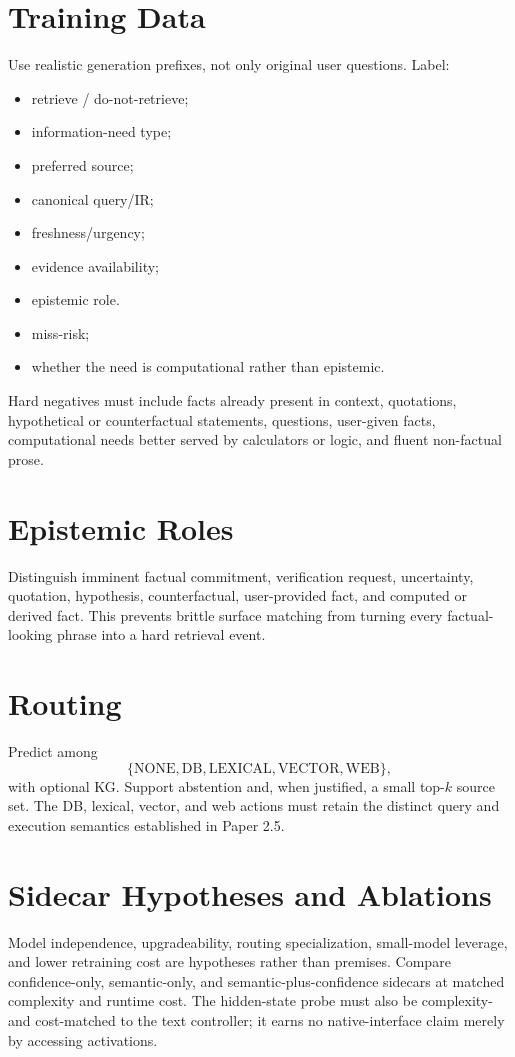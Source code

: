 \documentclass[11pt]{article}
\begin{document}
\section{Training Data}
Use realistic generation prefixes, not only original user questions. Label:
\begin{itemize}
\item retrieve / do-not-retrieve;
\item information-need type;
\item preferred source;
\item canonical query/IR;
\item freshness/urgency;
\item evidence availability;
\item epistemic role.
\item miss-risk;
\item whether the need is computational rather than epistemic.
\end{itemize}

Hard negatives must include facts already present in context, quotations,
hypothetical or counterfactual statements, questions, user-given facts,
computational needs better served by calculators or logic, and fluent
non-factual prose.

\section{Epistemic Roles}
Distinguish imminent factual commitment, verification request, uncertainty,
quotation, hypothesis, counterfactual, user-provided fact, and computed or
derived fact. This prevents brittle surface matching from turning every
factual-looking phrase into a hard retrieval event.

\section{Routing}
Predict among
\[
\{\mathrm{NONE},\mathrm{DB},\mathrm{LEXICAL},\mathrm{VECTOR},\mathrm{WEB}\},
\]
with optional KG. Support abstention and, when justified, a small top-$k$ source
set. The DB, lexical, vector, and web actions must retain the distinct query and
execution semantics established in Paper 2.5.

\section{Sidecar Hypotheses and Ablations}
Model independence, upgradeability, routing specialization, small-model
leverage, and lower retraining cost are hypotheses rather than premises. Compare
confidence-only, semantic-only, and semantic-plus-confidence sidecars at matched
complexity and runtime cost. The hidden-state probe must also be complexity- and
cost-matched to the text controller; it earns no native-interface claim merely
by accessing activations.
\end{document}
